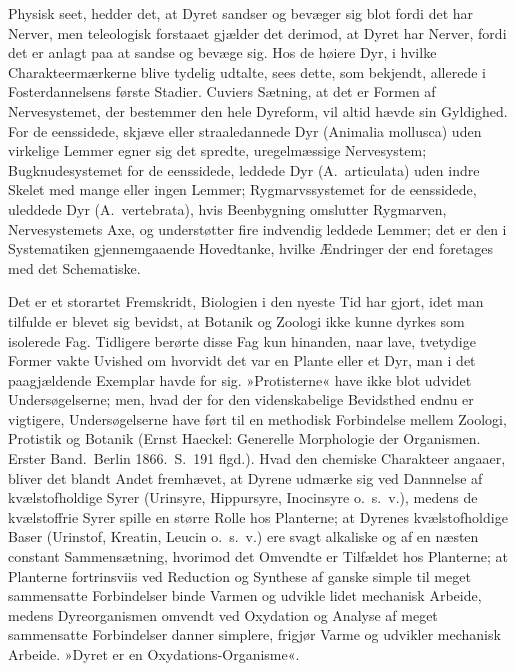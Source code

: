 \documentclass[12pt]{book}
\newcommand{\apage}[1]{\marginnote{\footnotesize\textit{[#1]}}}
\begin{document}
Physisk seet, hedder det, at Dyret sandser og bevæger sig blot fordi det
har Nerver, men teleologisk forstaaet gjælder det derimod, at Dyret har
Nerver, fordi det er anlagt paa at sandse og bevæge sig. Hos de høiere Dyr,
i hvilke Charakteermærkerne blive tydelig udtalte, sees dette, som
bekjendt, allerede i Fosterdannelsens første Stadier. Cuviers Sætning, at
det er Formen af Nervesystemet, der bestemmer den hele Dyreform, vil altid
hævde sin Gyldighed. For de eenssidede, skjæve eller straaledannede Dyr
(Animalia mollusca) uden virkelige Lemmer egner sig det spredte,
uregelmæssige Nervesystem; Bugknudesystemet for de eenssidede, leddede Dyr
(A.\ articulata) uden indre Skelet med mange eller ingen Lemmer;
Rygmarvssystemet for de eenssidede, uleddede Dyr (A.\ vertebrata),
hvis Beenbygning omslutter Rygmarven, Nervesystemets Axe, og understøtter
fire indvendig leddede Lemmer; det er den i Systematiken gjennemgaaende
Hovedtanke, hvilke Ændringer der end foretages med det Schematiske.

Det er et storartet Fremskridt, Biologien i den nyeste Tid har gjort, idet
man tilfulde er blevet sig bevidst, at Botanik og Zoologi ikke kunne dyrkes
som isolerede Fag. Tidligere berørte disse Fag kun hinanden, naar lave,
tvetydige Former vakte Uvished om hvorvidt det var en Plante eller et Dyr,
man i det \apage{192} paagjældende Exemplar havde for sig. »Protisterne« have ikke blot
udvidet Undersøgelserne; men, hvad der for den videnskabelige Bevidsthed
endnu er vigtigere, Undersøgelserne have ført til en methodisk Forbindelse
mellem Zoologi, Protistik og Botanik (Ernst Haeckel: Generelle
Morphologie der Organismen. Erster Band.\ Berlin 1866.\ S.\ 191 flgd.).
Hvad den chemiske Charakteer angaaer, bliver det blandt Andet fremhævet, at
Dyrene udmærke sig ved Dannnelse af kvælstofholdige Syrer (Urinsyre,
Hippursyre, Inocinsyre o.\ s.\ v.), medens de kvælstoffrie Syrer spille en
større Rolle hos Planterne; at Dyrenes kvælstofholdige Baser (Urinstof,
Kreatin, Leucin o.\ s.\ v.) ere svagt alkaliske og af en næsten constant
Sammensætning, hvorimod det Omvendte er Tilfældet hos Planterne; at
Planterne fortrinsviis ved Reduction og Synthese af ganske simple til meget
sammensatte Forbindelser binde Varmen og udvikle lidet mechanisk Arbeide,
medens Dyreorganismen omvendt ved Oxydation og Analyse af meget sammensatte
Forbindelser danner simplere, frigjør Varme og udvikler mechanisk Arbeide.
»Dyret er en Oxydations-Organisme«.
\end{document}

